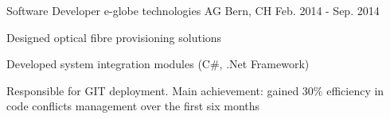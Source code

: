 \begin{cventries}
\smallskip

  \cventry
    {Software Developer} %
    {e-globe technologies AG} %
    {Bern, CH} %
    {Feb. 2014 - Sep. 2014} %
    {
      \begin{cvitems} %
        \item {Designed optical fibre provisioning solutions}
		\item {Developed system integration modules (C\#, .Net Framework)}
		\item {Responsible for GIT deployment. Main achievement: gained 30\% efficiency in code conflicts management over the first six months}
      \end{cvitems}
    }

\end{cventries}
